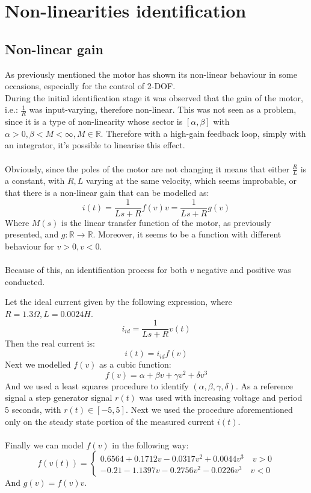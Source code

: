 \chapter{Non-linearities identification}

\section{Non-linear gain}
As previously mentioned the motor has shown its non-linear behaviour in some occasions, especially for the control of 2-DOF. \\
During the initial identification stage it was observed that the gain of the motor, i.e.: $\frac{1}{R}$ was input-varying, therefore non-linear. This was not seen as a problem, since it is a type of non-linearity whose sector is $[\alpha, \beta]$ with $\alpha > 0, \beta <M < \infty, M \in \mathbb{R}$. Therefore with a high-gain feedback loop, simply with an integrator, it's possible to linearise this effect. \\ \\
Obviously, since the poles of the motor are not changing  it means that either $\frac{R}{L}$ is a constant, with $R,L$ varying at the same velocity, which seems improbable, or that there is a non-linear gain that can be modelled as:
\begin{equation}
i(t)=\frac{1}{Ls+R} f(v)v = \frac{1}{Ls+R} g(v)
\end{equation}
Where $M(s)$ is the linear transfer function of the motor, as previously presented, and $g: \mathbb{R} \to \mathbb{R}$.
Moreover, it seems to be a function with different behaviour for $v>0, v<0$. \\ \\Because of this, an identification process for both $v$ negative and positive was conducted.

Let the ideal current given by the following expression, where $R=1.3 \Omega, L=0.0024 H$.
\begin{equation}
i_{id}=\frac{1}{Ls+R} v(t)
\end{equation}
Then the real current is:
\begin{equation}
i(t)=  i_{id} f(v)
\end{equation}
Next we modelled $f(v)$ as a cubic function:
\begin{equation}
f(v) = \alpha+\beta v + \gamma v^2+\delta v^3
\end{equation}
And we  used a least squares procedure to identify $(\alpha, \beta, \gamma,\delta)$.
As a reference signal a step generator signal $r(t)$ was used with increasing voltage and period $5$ seconds, with $r(t) \in [-5,5]$. Next we used the procedure aforementioned only on the steady state portion  of the  measured current $i(t)$.\\ \\
Finally we can model $f(v)$ in the following way:
\begin{equation}
f(v(t)) = \begin{cases}
0.6564+0.1712v-0.0317v^2+0.0044v^3 \quad v>0 \\
-0.21-1.1397v-0.2756v^2-0.0226v^3 \quad v< 0
\end{cases}
\end{equation}
And $g(v) =f(v)v$.

